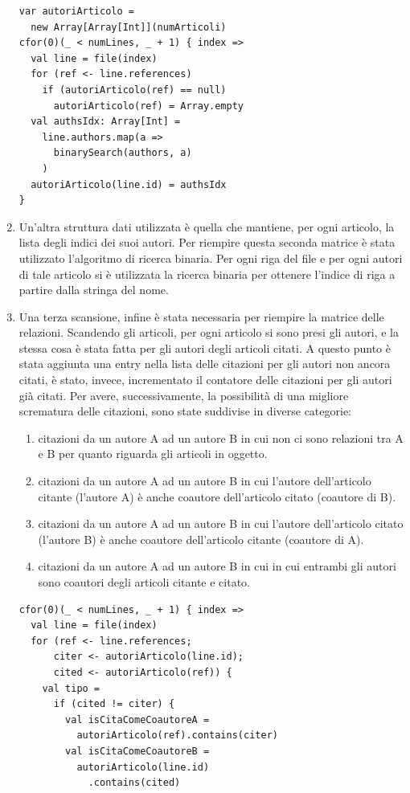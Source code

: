 \documentclass[a4paper, 12pt]{article}
\begin{document}
\begin{enumerate}
\begin{lstlisting}[keepspaces=true]
var autoriArticolo =
  new Array[Array[Int]](numArticoli)
cfor(0)(_ < numLines, _ + 1) { index =>
  val line = file(index)
  for (ref <- line.references)
    if (autoriArticolo(ref) == null)
      autoriArticolo(ref) = Array.empty
  val authsIdx: Array[Int] =
    line.authors.map(a =>
      binarySearch(authors, a)
    )
  autoriArticolo(line.id) = authsIdx
}
  \end{lstlisting}
  \item Un'altra struttura dati utilizzata è quella che mantiene, per ogni articolo, la lista degli indici dei suoi autori. Per riempire questa seconda matrice è stata utilizzato l'algoritmo di ricerca binaria.
  Per ogni riga del file e per ogni autori di tale articolo si è utilizzata la ricerca binaria per ottenere l'indice di riga a partire dalla stringa del nome.
  \item Una terza scansione, infine è stata necessaria per riempire la matrice delle relazioni. Scandendo gli articoli, per ogni articolo si sono presi gli autori, e la stessa cosa è stata fatta per gli autori degli articoli citati. A questo punto è stata aggiunta una entry nella lista delle citazioni per gli autori non ancora citati, è stato, invece, incrementato il contatore delle citazioni per gli autori già citati. Per avere, successivamente, la possibilità di una migliore scrematura delle citazioni, sono state suddivise in diverse categorie:
  \begin{enumerate}
    \item citazioni da un autore A ad un autore B in cui non ci sono relazioni tra A e B per quanto riguarda gli articoli in oggetto.
    \item citazioni da un autore A ad un autore B in cui l'autore dell'articolo citante (l'autore A) è anche coautore dell'articolo citato (coautore di B).
    \item citazioni da un autore A ad un autore B in cui l'autore dell'articolo citato (l'autore B) è anche coautore dell'articolo citante (coautore di A).
    \item citazioni da un autore A ad un autore B in cui in cui entrambi gli autori sono coautori degli articoli citante e citato. 
  \end{enumerate}
  \begin{lstlisting}[keepspaces=true]
cfor(0)(_ < numLines, _ + 1) { index =>
  val line = file(index)
  for (ref <- line.references; 
      citer <- autoriArticolo(line.id);
      cited <- autoriArticolo(ref)) {
    val tipo =
      if (cited != citer) {
        val isCitaComeCoautoreA = 
          autoriArticolo(ref).contains(citer)
        val isCitaComeCoautoreB = 
          autoriArticolo(line.id)
            .contains(cited)


\end{lstlisting}
\end{enumerate}
\end{document}
